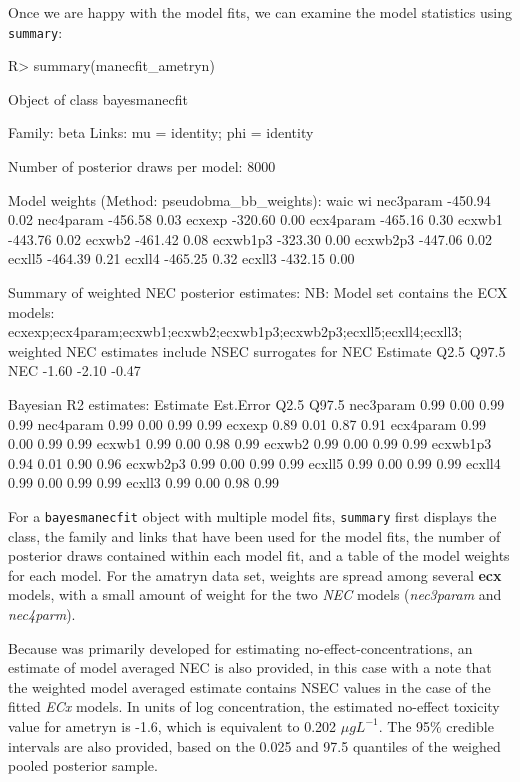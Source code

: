 \documentclass[
  shortnames]{jss}
\begin{document}
Once we are happy with the model fits, we can examine the model statistics using \texttt{summary}:

\begin{CodeChunk}
\begin{CodeInput}
R> summary(manecfit_ametryn)
\end{CodeInput}
\begin{CodeOutput}
Object of class bayesmanecfit

 Family: beta  
  Links: mu = identity; phi = identity  

Number of posterior draws per model:  8000

Model weights (Method: pseudobma_bb_weights):
             waic   wi
nec3param -450.94 0.02
nec4param -456.58 0.03
ecxexp    -320.60 0.00
ecx4param -465.16 0.30
ecxwb1    -443.76 0.02
ecxwb2    -461.42 0.08
ecxwb1p3  -323.30 0.00
ecxwb2p3  -447.06 0.02
ecxll5    -464.39 0.21
ecxll4    -465.25 0.32
ecxll3    -432.15 0.00


Summary of weighted NEC posterior estimates:
NB: Model set contains the ECX models: ecxexp;ecx4param;ecxwb1;ecxwb2;ecxwb1p3;ecxwb2p3;ecxll5;ecxll4;ecxll3; weighted NEC estimates include NSEC surrogates for NEC
    Estimate  Q2.5 Q97.5
NEC    -1.60 -2.10 -0.47


Bayesian R2 estimates:
          Estimate Est.Error Q2.5 Q97.5
nec3param     0.99      0.00 0.99  0.99
nec4param     0.99      0.00 0.99  0.99
ecxexp        0.89      0.01 0.87  0.91
ecx4param     0.99      0.00 0.99  0.99
ecxwb1        0.99      0.00 0.98  0.99
ecxwb2        0.99      0.00 0.99  0.99
ecxwb1p3      0.94      0.01 0.90  0.96
ecxwb2p3      0.99      0.00 0.99  0.99
ecxll5        0.99      0.00 0.99  0.99
ecxll4        0.99      0.00 0.99  0.99
ecxll3        0.99      0.00 0.98  0.99
\end{CodeOutput}
\end{CodeChunk}

For a \texttt{bayesmanecfit} object with multiple model fits, \texttt{summary} first displays the class, the family and links that have been used for the model fits, the number of posterior draws contained within each model fit, and a table of the model weights for each model. For the amatryn data set, weights are spread among several \textbf{ecx} models, with a small amount of weight for the two \emph{NEC} models (\emph{nec3param} and \emph{nec4parm}).

Because  was primarily developed for estimating no-effect-concentrations, an estimate of model averaged NEC is also provided, in this case with a note that the weighted model averaged estimate contains NSEC values in the case of the fitted \emph{ECx} models. In units of log concentration, the estimated no-effect toxicity value for ametryn is -1.6, which is equivalent to 0.202 \({\mu}gL^{-1}\). The 95\% credible intervals are also provided, based on the 0.025 and 97.5 quantiles of the weighed pooled posterior sample.
\end{document}
